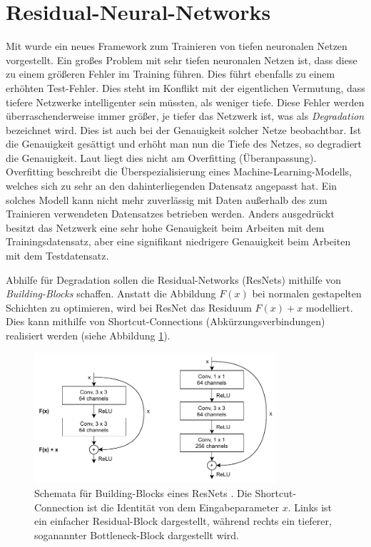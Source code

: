 \section{Residual-Neural-Networks}\label{section:residual-blocks}
Mit \cite{he2015deep} wurde ein neues Framework zum Trainieren von tiefen
neuronalen Netzen vorgestellt. Ein großes Problem mit sehr tiefen neuronalen
Netzen ist, dass diese zu einem größeren Fehler im Training führen. Dies führt
ebenfalls zu einem erhöhten Test-Fehler. Dies steht im Konflikt mit der
eigentlichen Vermutung, dass tiefere Netzwerke intelligenter sein müssten, als
weniger tiefe. Diese Fehler werden überraschenderweise immer größer, je tiefer
das Netzwerk ist, was als \textit{Degradation} bezeichnet wird.
Dies ist auch bei der Genauigkeit solcher Netze beobachtbar. Ist die
Genauigkeit gesättigt und erhöht man nun die Tiefe des Netzes, so degradiert
die Genauigkeit. Laut \cite{he2015deep} liegt dies nicht am Overfitting
(Überanpassung). Overfitting beschreibt die Überspezialisierung eines
Machine-Learning-Modells, welches sich zu sehr an den dahinterliegenden
Datensatz angepasst hat. Ein solches Modell kann nicht mehr zuverlässig mit
Daten außerhalb des zum Trainieren verwendeten Datensatzes betrieben werden.
Anders ausgedrückt besitzt das Netzwerk eine sehr hohe Genauigkeit beim
Arbeiten mit dem Trainingsdatensatz, aber eine signifikant niedrigere
Genauigkeit beim Arbeiten mit dem Testdatensatz.

Abhilfe für Degradation sollen die Residual-Networks (ResNets) mithilfe von
\textit{Building-Blocks} schaffen. Anstatt die Abbildung
$F(x)$ bei normalen gestapelten Schichten zu optimieren, wird bei ResNet das
Residuum $F(x) + x$ modelliert. Dies kann mithilfe von Shortcut-Connections
(Abkürzungsverbindungen) realisiert werden (siehe Abbildung
\ref{fig:resnet-building-block}).

\begin{figure}
    \centering
    \includegraphics[width=0.8\textwidth]{images/resnet_building_block.pdf}
    \caption{Schemata für Building-Blocks eines ResNets \cite{he2015deep}. Die
    Shortcut-Connection ist die Identität von dem Eingabeparameter $x$. Links ist ein einfacher Residual-Block dargestellt, während rechts ein tieferer, soganannter Bottleneck-Block dargestellt wird.}
    \label{fig:resnet-building-block}
\end{figure}

